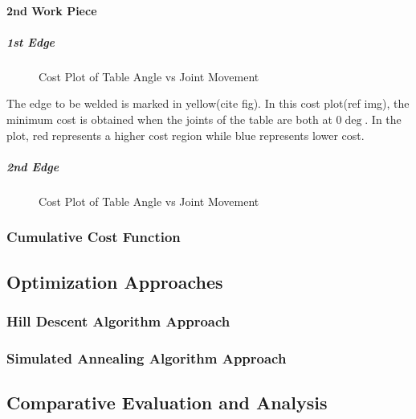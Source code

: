 \paragraph{2nd Work Piece}
\subparagraph{1st Edge}

\begin{figure}[!htbp] %
 \centering
   \caption{Cost Plot of Table Angle vs Joint Movement}
\label{fig:img19}
\end{figure}
The edge to be welded is marked in yellow(cite fig). In this cost plot(ref img), the minimum cost is obtained when the joints of the table are both at 0$\deg$. In the plot, red represents a higher cost region while blue represents lower cost.
\subparagraph{2nd Edge}
\begin{figure}[!htbp] %
 \centering
   \caption{Cost Plot of Table Angle vs Joint Movement}
\label{fig:img18}
\end{figure}
\subsubsection{Cumulative Cost Function}
\subsection{Optimization Approaches}
\subsubsection{Hill Descent Algorithm Approach}
\subsubsection{Simulated Annealing Algorithm Approach}
\subsection{Comparative Evaluation and Analysis}
